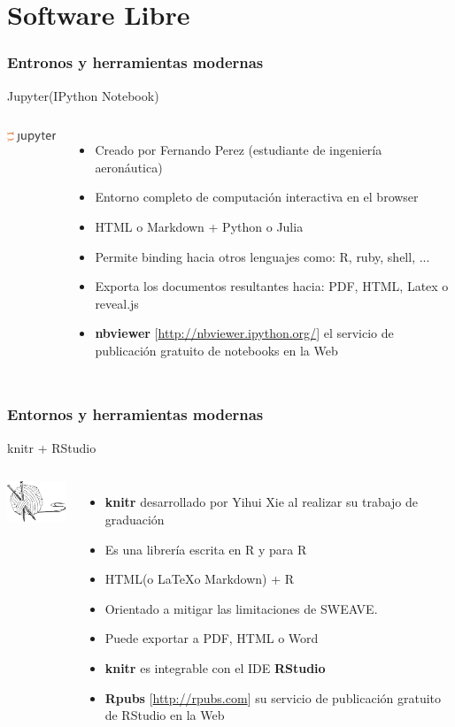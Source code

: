 \documentclass[sans serif,9pt,xcolor=dvipsnames]{beamer}%
\begin{document}
\section{Software Libre}
\begin{frame}
\frametitle {Entronos y herramientas modernas}
\justifying
\begin{block}{Jupyter(IPython Notebook)}
\begin{columns}
 \hspace{0.7cm}
\includegraphics[width=2.2cm]{imagenes/jupyter.png} 
\begin{itemize}
\justifying
\item Creado por Fernando Perez (estudiante de ingeniería aeronáutica)
\item Entorno completo de computación interactiva en el browser
\item HTML o Markdown + Python o Julia
\item Permite binding hacia otros lenguajes como: R, ruby, shell, ...
\item Exporta los documentos resultantes hacia: PDF, HTML, Latex o reveal.js 
\item \textbf{nbviewer} [\url{http://nbviewer.ipython.org/}] el servicio de publicación gratuito de notebooks en la Web 
\end{itemize}
\end{columns}
\end{block}
\end{frame}

\begin{frame}
\frametitle {Entornos y herramientas modernas}
\justifying
\begin{block}{knitr + RStudio}
\begin{columns}
 \hspace{0.7cm}
\includegraphics[width=2.3cm]{imagenes/knitr.png} 
\begin{itemize}
\justifying
\item \textbf{knitr} desarrollado por Yihui Xie al realizar su trabajo de graduación
\item Es una librería escrita en R y para R
\item HTML(o \LaTeX o Markdown) + R 
\item Orientado a mitigar las limitaciones de SWEAVE.
\item Puede exportar a PDF, HTML o Word
\item \textbf{knitr} es integrable con el IDE \textbf{RStudio}
\item \textbf{Rpubs} [\url{http://rpubs.com}] su servicio de publicación gratuito de RStudio en la Web
\end{itemize}
\end{columns}
\end{block}
\end{frame}
\end{document}
